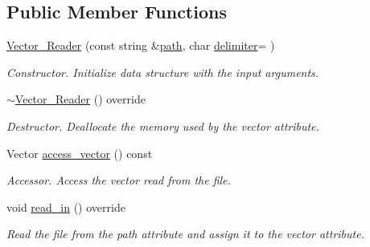 \subsection*{Public Member Functions}
\begin{DoxyCompactItemize}
\item 
\mbox{\label{class_vector___reader_a373565979af8b307dfddee36b22d7816}} 
\mbox{\hyperlink{class_vector___reader_a373565979af8b307dfddee36b22d7816}{Vector\+\_\+\+Reader}} (const string \&\mbox{\hyperlink{class_reader_a4f3eaccb117f248d4649ffb4e793a23d}{path}}, char \mbox{\hyperlink{class_data___reader_ac05700473d754089d7f30d2cc7dccce9}{delimiter}}=\textquotesingle{} \textquotesingle{})
\begin{DoxyCompactList}\small\item\em Constructor. Initialize data structure with the input arguments. \end{DoxyCompactList}\item 
\mbox{\label{class_vector___reader_ad0609117e3120f06dda2eff01004f2be}} 
\mbox{\hyperlink{class_vector___reader_ad0609117e3120f06dda2eff01004f2be}{$\sim$\+Vector\+\_\+\+Reader}} () override
\begin{DoxyCompactList}\small\item\em Destructor. Deallocate the memory used by the vector attribute. \end{DoxyCompactList}\item 
\mbox{\label{class_vector___reader_a60ca6034f26794cbc0a5acfbadf5cff4}} 
Vector \mbox{\hyperlink{class_vector___reader_a60ca6034f26794cbc0a5acfbadf5cff4}{access\+\_\+vector}} () const
\begin{DoxyCompactList}\small\item\em Accessor. Access the vector read from the file. \end{DoxyCompactList}\item 
\mbox{\label{class_vector___reader_aa4ce4311cab6358f17813bb293456942}} 
void \mbox{\hyperlink{class_vector___reader_aa4ce4311cab6358f17813bb293456942}{read\+\_\+in}} () override
\begin{DoxyCompactList}\small\item\em Read the file from the path attribute and assign it to the vector attribute. \end{DoxyCompactList}\end{DoxyCompactItemize}
